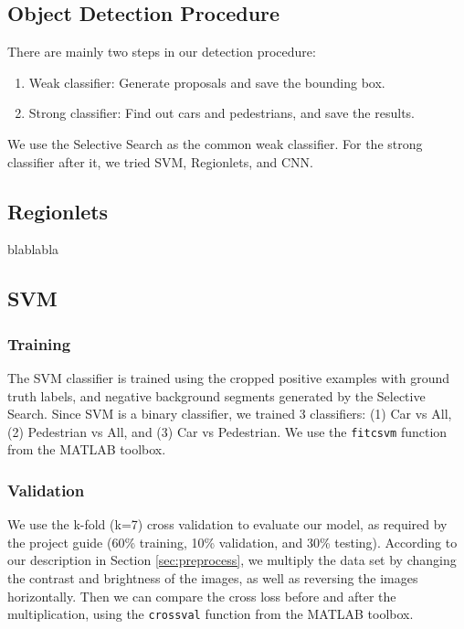\documentclass{article} %
\begin{document}
\subsection{Object Detection Procedure}

There are mainly two steps in our detection procedure: 
\begin{enumerate}[Step 1]
    \item Weak classifier: Generate proposals and save the bounding box.
    \item Strong classifier: Find out cars and pedestrians, and save the results.
\end{enumerate}

We use the Selective Search \cite{van2011segmentation} as the common weak classifier. For the strong classifier after it, we tried SVM, Regionlets, and CNN.

\subsection{Regionlets}

blablabla

\subsection{SVM}

\subsubsection{Training}

The SVM classifier is trained using the cropped positive examples with ground truth labels, and negative background segments generated by the Selective Search. Since SVM is a binary classifier, we trained 3 classifiers: (1) Car vs All, (2) Pedestrian vs All, and (3) Car vs Pedestrian. We use the \texttt{fitcsvm} function from the MATLAB toolbox.

\subsubsection{Validation}

We use the k-fold (k=7) cross validation to evaluate our model, as required by the project guide (60\% training, 10\% validation, and 30\% testing). According to our description in Section \ref{sec:preprocess}, we multiply the data set by changing the contrast and brightness of the images, as well as reversing the images horizontally. Then we can compare the cross loss before and after the multiplication, using the \texttt{crossval} function from the MATLAB toolbox.
\end{document}
